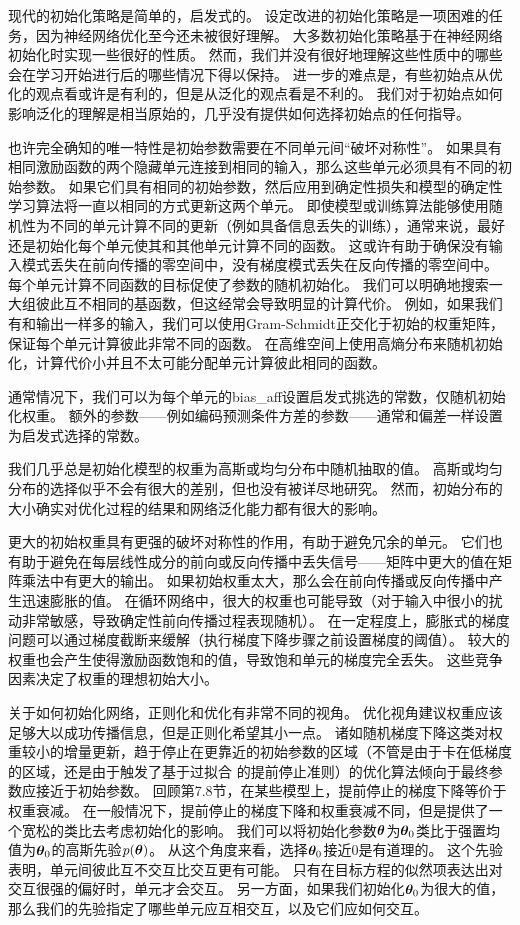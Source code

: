 
现代的初始化策略是简单的，启发式的。
设定改进的初始化策略是一项困难的任务，因为神经网络优化至今还未被很好理解。
大多数初始化策略基于在神经网络初始化时实现一些很好的性质。
然而，我们并没有很好地理解这些性质中的哪些会在学习开始进行后的哪些情况下得以保持。
进一步的难点是，有些初始点从优化的观点看或许是有利的，但是从泛化的观点看是不利的。
我们对于初始点如何影响泛化的理解是相当原始的，几乎没有提供如何选择初始点的任何指导。

也许完全确知的唯一特性是初始参数需要在不同单元间``破坏对称性''。
如果具有相同激励函数的两个隐藏单元连接到相同的输入，那么这些单元必须具有不同的初始参数。
如果它们具有相同的初始参数，然后应用到确定性损失和模型的确定性学习算法将一直以相同的方式更新这两个单元。
即使模型或训练算法能够使用随机性为不同的单元计算不同的更新（例如具备信息丢失的训练），通常来说，最好还是初始化每个单元使其和其他单元计算不同的函数。
这或许有助于确保没有输入模式丢失在前向传播的零空间中，没有梯度模式丢失在反向传播的零空间中。
每个单元计算不同函数的目标促使了参数的随机初始化。
我们可以明确地搜索一大组彼此互不相同的基函数，但这经常会导致明显的计算代价。  
例如，如果我们有和输出一样多的输入，我们可以使用Gram-Schmidt正交化于初始的权重矩阵，保证每个单元计算彼此非常不同的函数。
在高维空间上使用高熵分布来随机初始化，计算代价小并且不太可能分配单元计算彼此相同的函数。

通常情况下，我们可以为每个单元的\gls{bias_aff}设置启发式挑选的常数，仅随机初始化权重。
额外的参数——例如编码预测条件方差的参数——通常和偏差一样设置为启发式选择的常数。

我们几乎总是初始化模型的权重为高斯或均匀分布中随机抽取的值。
高斯或均匀分布的选择似乎不会有很大的差别，但也没有被详尽地研究。
然而，初始分布的大小确实对优化过程的结果和网络泛化能力都有很大的影响。


更大的初始权重具有更强的破坏对称性的作用，有助于避免冗余的单元。
它们也有助于避免在每层线性成分的前向或反向传播中丢失信号——矩阵中更大的值在矩阵乘法中有更大的输出。
如果初始权重太大，那么会在前向传播或反向传播中产生迅速膨胀的值。
在循环网络中，很大的权重也可能导致（对于输入中很小的扰动非常敏感，导致确定性前向传播过程表现随机）。
在一定程度上，膨胀式的梯度问题可以通过梯度截断来缓解（执行梯度下降步骤之前设置梯度的阈值）。
较大的权重也会产生使得激励函数饱和的值，导致饱和单元的梯度完全丢失。
这些竞争因素决定了权重的理想初始大小。

关于如何初始化网络，正则化和优化有非常不同的视角。
优化视角建议权重应该足够大以成功传播信息，但是正则化希望其小一点。
诸如随机梯度下降这类对权重较小的增量更新，趋于停止在更靠近的初始参数的区域（不管是由于卡在低梯度的区域，还是由于触发了基于过拟合 的提前停止准则）的优化算法倾向于最终参数应接近于初始参数。
回顾第7.8节，在某些模型上，提前停止的梯度下降等价于权重衰减。
在一般情况下，提前停止的梯度下降和权重衰减不同，但是提供了一个宽松的类比去考虑初始化的影响。
我们可以将初始化参数$\boldsymbol{\theta}$为$\boldsymbol{\theta}_0$类比于强置均值为$\boldsymbol{\theta}_0$的高斯先验$p(\boldsymbol{\theta})$。
从这个角度来看，选择$\boldsymbol{\theta}_0$接近$0$是有道理的。
这个先验表明，单元间彼此互不交互比交互更有可能。
只有在目标方程的似然项表达出对交互很强的偏好时，单元才会交互。
另一方面，如果我们初始化$\boldsymbol{\theta}_0$为很大的值，那么我们的先验指定了哪些单元应互相交互，以及它们应如何交互。

